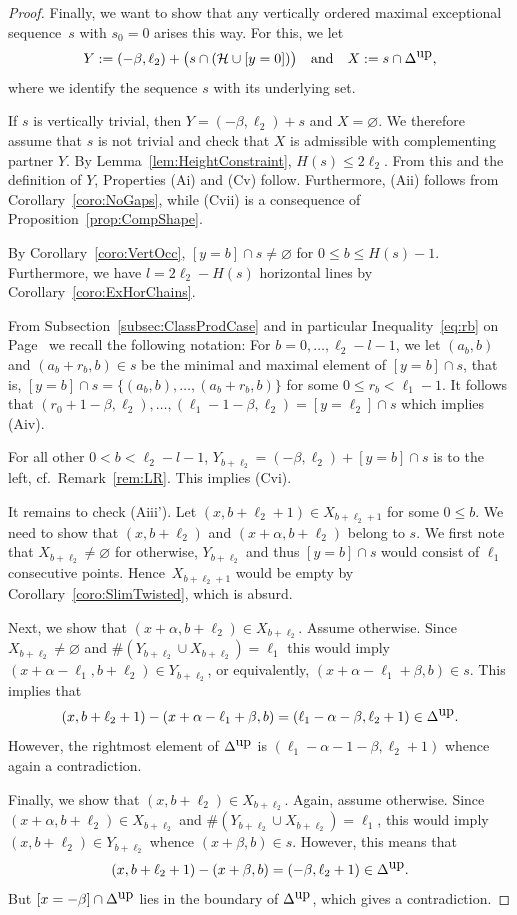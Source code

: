 \documentclass[11pt]{article}
\theoremstyle{definition}
\numberwithin{equation}{section}
\newcommand{\cH}{\mathcal{H}}
\newcommand{\xa}{\alpha}
\newcommand{\xb}{\beta}
\newcommand{\cl}{s}
\newcommand{\DeltaUp}{\Delta^{\mbox{\tiny up}}}
\newcommand{\nl}{{l}}
\newcommand{\mes}{maximal exceptional sequence}
\renewcommand{\sharp}{\#}
\newcommand{\ssect}[1]{Subsection~\ref{#1}}
\begin{document}
\begin{proof}
Finally, we want to show that any vertically
ordered {\mes}~$\cl$ with $\cl_0=0$ arises 
this way. For this, we let
$$
Y:=(-\xb,\ell_2)+\big(\cl\cap(\cH\cup[y=0])\big)
\quad\mbox{and}\quad X:=\cl\cap\DeltaUp,
$$ 
where we identify the sequence $\cl$ with its
underlying set. 

If $\cl$ is vertically trivial, 
then $Y=(-\xb,\ell_2)+\cl$ and $X=\varnothing$. 
We therefore assume that $\cl$ is not trivial
and check that $X$ is admissible with complementing
partner $Y$. By Lemma~\ref{lem:HeightConstraint},
$H(\cl)\leq2\ell_2$. From this and the definition 
of $Y$, Properties (Ai) and (Cv) follow. Furthermore, 
(Aii) follows from Corollary~\ref{coro:NoGaps}, while 
(Cvii) is a consequence of Proposition~\ref{prop:CompShape}.

By Corollary~\ref{coro:VertOcc}, $[y=b]\cap\cl\not=
\varnothing$ for $0\leq b\leq H(\cl)-1$. Furthermore,
we have $\nl=2\ell_2-H(\cl)$ horizontal lines by 
Corollary~\ref{coro:ExHorChains}. 

{From \ssect{subsec:ClassProdCase} and in particular 
Inequality~\eqref{eq:rb} on Page~\pageref{eq:rb} we recall 
the following notation:} For $b=0,\ldots,
\ell_2-\nl -1$, we let $(a_b,b)$ and $(a_b+r_b,b)\in\cl$ 
be the minimal and maximal element of $[y=b]\cap\cl$,
that is, \mbox{$[y=b]\cap\cl=\{(a_b,b),\ldots,(a_b+r_b,b)\}$} for some $0\leq r_b<\ell_1-1$. {It follows that} $(r_0+1-\xb,\ell_2),\ldots,(\ell_1-1-\xb,\ell_2)
=[y=\ell_2]\cap\cl$ which implies (Aiv). 

For all other $0<b<\ell_2-\nl -1$, 
$Y_{b+\ell_2}=(-\xb,\ell_2)+[y=b]\cap\cl$ is to the 
left, cf.\ Remark~\ref{rem:LR}. This implies (Cvi).

It remains to check (Aiii'). Let $(x,b+\ell_2+1)\in 
X_{b+\ell_2+1}$ for some $0\leq b$. We need to show 
that $(x,b+\ell_2)$ and $(x+\xa,b+\ell_2)$ belong to 
$\cl$. We first note that $X_{b+\ell_2}\neq\varnothing$ 
for otherwise, $Y_{b+\ell_2}$ and thus
$[y=b]\cap\cl$ would consist of $\ell_1$ 
consecutive points. Hence~$X_{b+\ell_2+1}$ 
would be empty by Corollary~\ref{coro:SlimTwisted}, 
which is absurd.

Next, we show that $(x+\xa,b+\ell_2)\in X_{b+\ell_2}$. 
Assume otherwise. Since $X_{b+\ell_2}\neq\varnothing$ 
and $\sharp(Y_{b+\ell_2}\cup X_{b+\ell_2})=\ell_1$ 
this would imply $(x+\xa-\ell_1,b+\ell_2)\in Y_{b+\ell_2}$, 
or equivalently, $(x+\xa-\ell_1+\xb,b)\in\cl$. {This implies 
that}
$$
(x,b+\ell_2+1)-(x+\xa-\ell_1+\xb,b)=
(\ell_1-\xa-\xb,\ell_2+1)\in\DeltaUp.
$$
However, the rightmost element of $\DeltaUp$ is 
$(\ell_1-\xa-1-\xb,\ell_2+1)$ whence again 
a contradiction.

Finally, we show that $(x,b+\ell_2)\in X_{b+\ell_2}$.
Again, assume otherwise. Since \mbox{$(x+\xa,b+\ell_2)\in X_{b+\ell_2}$}
and $\sharp(Y_{b+\ell_2}\cup X_{b+\ell_2})=\ell_1$, 
this would imply $(x,b+\ell_2)\in Y_{b+\ell_2}$ 
whence $(x+\xb, b)\in\cl$.
However, this means that
$$
(x,b+\ell_2+1)-(x+\xb,b)=(-\xb,\ell_2+1)\in\DeltaUp.
$$
But $[x=-\xb]\cap\DeltaUp$ lies in the boundary of
$\DeltaUp$, which gives a contradiction.
\end{proof}
\end{document}
